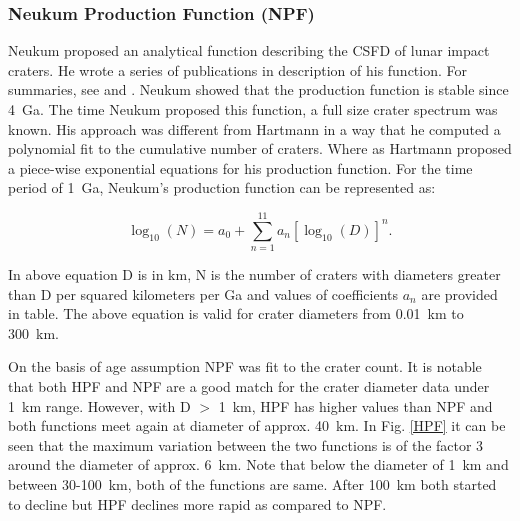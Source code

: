 \documentclass[11pt]{article}
\begin{document}
\subsubsection{Neukum Production Function (NPF)}
Neukum proposed an analytical function describing the CSFD of lunar impact craters. He wrote a series of publications in description of his function. For summaries, see \cite{neukum1994crater} and \cite{neukum1983meteoritenbombardement}. Neukum showed that the production function is stable since \SI{4}{Ga}. The time Neukum proposed this function, a full size crater spectrum was known. His approach was different from Hartmann in a way that he computed a polynomial fit to the cumulative number of craters. Where as Hartmann proposed a piece-wise exponential equations for his production function. For the time period of \SI{1}{Ga}, Neukum's production function can be represented as:

\begin{equation}
\log_{10} (N) = a_0 + \sum_{n=1}^{11} a_n[\log_{10} (D)]^n.
\end{equation}

In above equation D is in km, N is the number of craters with diameters greater than D per squared kilometers per Ga and values of coefficients $a_n$ are provided in table. The above equation is valid for crater diameters from \SI{0.01}{km} to \SI{300}{km}.

On the basis of age assumption NPF was fit to the crater count. It is notable that both HPF and NPF are a good match for the crater diameter data under \SI{1}{km} range. However, with D $>$ \SI{1}{km}, HPF has higher values than NPF and both functions meet again at diameter of approx. \SI{40}{km}. In Fig. \ref{HPF} it can be seen that the maximum variation between the two functions is of the factor 3 around the diameter of approx. \SI{6}{km}. Note that below the diameter of \SI{1}{km} and between 30-\SI{100}{km}, both of the functions are same. After \SI{100}{km} both started to decline but HPF declines more rapid as compared to NPF.
\end{document}

